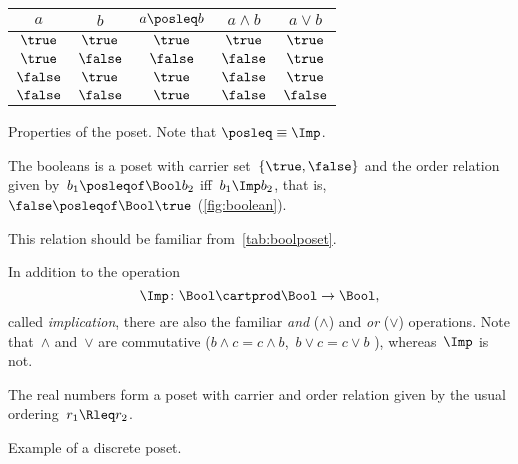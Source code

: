 \begin{margintable}
    \centering
    \begin{tabular}{cc|ccc}
        $a$      & $b$      & $a \posleq  b$ & $a \wedge b$ & $a \vee b$ \\ \hline
        $\true$  & $\true$  & $\true$        & $\true$      & $\true$ \\
        $\true$  & $\false$ & $\false$       & $\false$     & $\true$ \\
        $\false$ & $\true$  & $\true$        & $\false$     & $\true$ \\
        $\false$ & $\false$ & $\true$        & $\false$     & $\false$
    \end{tabular}
    \caption{Properties of the \Bool poset.
        Note that $\posleq \equiv \Imp$.
    }
    \label{tab:boolposet}
\end{margintable}

\begin{example}[Booleans]
    \label{ex:bool}
    The booleans \index{\Bool} is a poset with carrier set~$\{\true,\false\}$ and the order relation given by~$b_1 \posleqof\Bool b_2$ iff~$b_1 \Imp b_2$, that is,~$\false \posleqof\Bool \true$ (\cref{fig:boolean}).

    This relation should be familiar from~\cref{tab:boolposet}.

    In addition to the operation
    \begin{equation*}
        \Imp\colon\Bool\cartprod \Bool\to\Bool,
    \end{equation*}
    called \emph{implication}, there are also the familiar \emph{and} ($\wedge$) and \emph{or} ($\vee$) operations.
    Note that~$\wedge$ and~$\vee$ are commutative ($b\wedge c = c\wedge b$,~$b\vee c = c\vee b$ ), whereas~$\Imp$ is not.
\end{example}


\begin{example}[Reals]
    The real numbers \reals form a poset with carrier \reals and order relation given by the usual ordering~$r_1 \Rleq r_2$.
\end{example}

\begin{marginfigure}
    \centering
    \caption{Example of a discrete poset.}
    \label{fig:discretepos}
\end{marginfigure}

